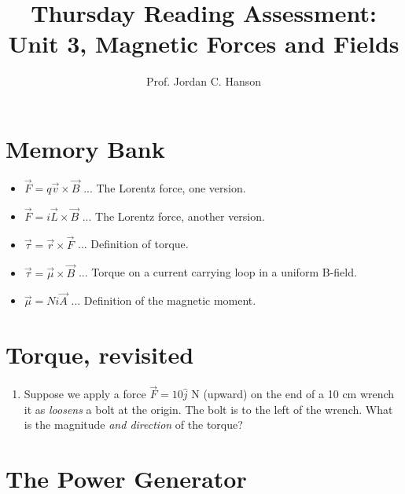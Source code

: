 \documentclass{article}
\begin{document}
\title{Thursday Reading Assessment: Unit 3, Magnetic Forces and Fields}
\author{Prof. Jordan C. Hanson}

\maketitle

\section{Memory Bank}

\begin{itemize}
\item $\vec{F} = q\vec{v} \times \vec{B}$ ... The Lorentz force, one version.
\item $\vec{F} = i\vec{L} \times \vec{B}$ ... The Lorentz force, another version.
\item $\vec{\tau} = \vec{r} \times \vec{F}$ ... Definition of torque.
\item $\vec{\tau} = \vec{\mu} \times \vec{B}$ ... Torque on a current carrying loop in a uniform B-field.
\item $\vec{\mu} = Ni\vec{A}$ ... Definition of the magnetic moment.
\end{itemize}

\section{Torque, revisited}

\begin{enumerate}
\item Suppose we apply a force $\vec{F} = 10\hat{j}$ N (upward) on the end of a 10 cm wrench it as \textit{loosens} a bolt at the origin.  The bolt is to the left of the wrench.  What is the magnitude \textit{and direction} of the torque? \\ \vspace{1cm}
\end{enumerate}

\section{The Power Generator}
\end{document}
